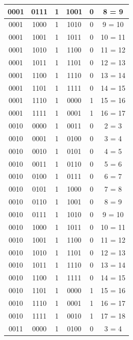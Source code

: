\documentclass{exam}
\begin{document}
\begin{center}
\begin{longtable}{|c|c|c|c|c|c|}
                0001 & 0111 & 1 & 1001 & 0 & 8 = 9 \\ \hline
                0001 & 1000 & 1 & 1010 & 0 & 9 = 10 \\ \hline
                0001 & 1001 & 1 & 1011 & 0 & 10 = 11 \\ \hline
                0001 & 1010 & 1 & 1100 & 0 & 11 = 12 \\ \hline
                0001 & 1011 & 1 & 1101 & 0 & 12 = 13 \\ \hline
                0001 & 1100 & 1 & 1110 & 0 & 13 = 14 \\ \hline
                0001 & 1101 & 1 & 1111 & 0 & 14 = 15 \\ \hline
                0001 & 1110 & 1 & 0000 & 1 & 15 = 16 \\ \hline
                0001 & 1111 & 1 & 0001 & 1 & 16 = 17 \\ \hline
                0010 & 0000 & 1 & 0011 & 0 & 2 = 3 \\ \hline
                0010 & 0001 & 1 & 0100 & 0 & 3 = 4 \\ \hline
                0010 & 0010 & 1 & 0101 & 0 & 4 = 5 \\ \hline
                0010 & 0011 & 1 & 0110 & 0 & 5 = 6 \\ \hline
                0010 & 0100 & 1 & 0111 & 0 & 6 = 7 \\ \hline
                0010 & 0101 & 1 & 1000 & 0 & 7 = 8 \\ \hline
                0010 & 0110 & 1 & 1001 & 0 & 8 = 9 \\ \hline
                0010 & 0111 & 1 & 1010 & 0 & 9 = 10 \\ \hline
                0010 & 1000 & 1 & 1011 & 0 & 10 = 11 \\ \hline
                0010 & 1001 & 1 & 1100 & 0 & 11 = 12 \\ \hline
                0010 & 1010 & 1 & 1101 & 0 & 12 = 13 \\ \hline
                0010 & 1011 & 1 & 1110 & 0 & 13 = 14 \\ \hline
                0010 & 1100 & 1 & 1111 & 0 & 14 = 15 \\ \hline
                0010 & 1101 & 1 & 0000 & 1 & 15 = 16 \\ \hline
                0010 & 1110 & 1 & 0001 & 1 & 16 = 17 \\ \hline
                0010 & 1111 & 1 & 0010 & 1 & 17 = 18 \\ \hline
                0011 & 0000 & 1 & 0100 & 0 & 3 = 4 \\ \hline

\end{longtable}
\end{center}
\end{document}
